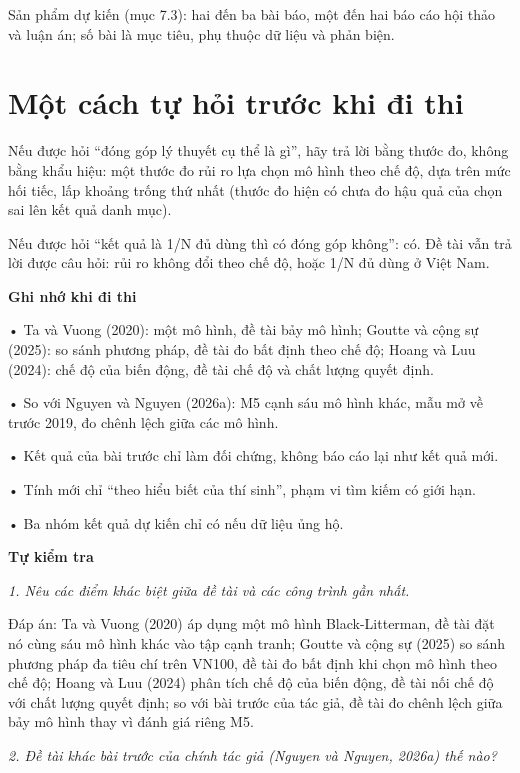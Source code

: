 Sản phẩm dự kiến (mục 7.3): hai đến ba bài báo, một đến hai báo cáo hội thảo và luận án; số bài là mục tiêu, phụ thuộc dữ liệu và phản biện.

\section{Một cách tự hỏi trước khi đi thi}

Nếu được hỏi “đóng góp lý thuyết cụ thể là gì”, hãy trả lời bằng thước đo, không bằng khẩu hiệu: một thước đo rủi ro lựa chọn mô hình theo chế độ, dựa trên mức hối tiếc, lấp khoảng trống thứ nhất (thước đo hiện có chưa đo hậu quả của chọn sai lên kết quả danh mục).

Nếu được hỏi “kết quả là 1/N đủ dùng thì có đóng góp không”: có. Đề tài vẫn trả lời được câu hỏi: rủi ro không đổi theo chế độ, hoặc 1/N đủ dùng ở Việt Nam.

\begin{tcolorbox}[breakable]
\textbf{Ghi nhớ khi đi thi}

• Ta và Vuong (2020): một mô hình, đề tài bảy mô hình; Goutte và cộng sự (2025): so sánh phương pháp, đề tài đo bất định theo chế độ; Hoang và Luu (2024): chế độ của biến động, đề tài chế độ và chất lượng quyết định.

• So với Nguyen và Nguyen (2026a): M5 cạnh sáu mô hình khác, mẫu mở về trước 2019, đo chênh lệch giữa các mô hình.

• Kết quả của bài trước chỉ làm đối chứng, không báo cáo lại như kết quả mới.

• Tính mới chỉ “theo hiểu biết của thí sinh”, phạm vi tìm kiếm có giới hạn.

• Ba nhóm kết quả dự kiến chỉ có nếu dữ liệu ủng hộ.
\end{tcolorbox}

\textbf{Tự kiểm tra}

{\itshape 1. Nêu các điểm khác biệt giữa đề tài và các công trình gần nhất.\par}

Đáp án: Ta và Vuong (2020) áp dụng một mô hình Black-Litterman, đề tài đặt nó cùng sáu mô hình khác vào tập cạnh tranh; Goutte và cộng sự (2025) so sánh phương pháp đa tiêu chí trên VN100, đề tài đo bất định khi chọn mô hình theo chế độ; Hoang và Luu (2024) phân tích chế độ của biến động, đề tài nối chế độ với chất lượng quyết định; so với bài trước của tác giả, đề tài đo chênh lệch giữa bảy mô hình thay vì đánh giá riêng M5.

{\itshape 2. Đề tài khác bài trước của chính tác giả (Nguyen và Nguyen, 2026a) thế nào?\par}

